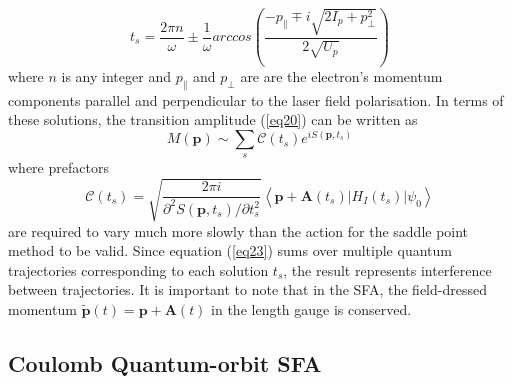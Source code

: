 \documentclass[11pt]{article}
\numberwithin{equation}{section}
\begin{document}
\begin{equation}
    t_s = \frac{2\pi n}{\omega} \pm \frac{1}{\omega} arccos \left (\frac{-p_{\parallel} \mp i \sqrt{2 I_p + p_\perp^2}}{2\sqrt{U_p}} \right )
\end{equation}
where $n$ is any integer and $p_\parallel$ and $p_\perp$ are are the electron's momentum components parallel and perpendicular to the laser field polarisation. In terms of these solutions, the transition amplitude (\ref{eq20}) can be written as 
\begin{equation} \label{eq23}
    M(\textbf{p}) \sim \sum_s \mathcal{C}(t_s) e^{iS(\textbf{p},t_s)}
\end{equation}
where prefactors 
\begin{equation} \label{eq:prefactor}
    \mathcal{C}(t_s) = \sqrt{\frac{2\pi i}{\partial^2S(\textbf{p},t_s)/\partial t_s^2}} \left\langle\textbf{p} + \textbf{A}(t_s)|H_I(t_s)|\psi_0\right\rangle
\end{equation}
are required to vary much more slowly than the action for the saddle point method to be valid\cite{wahl_1964_analytic}. Since equation (\ref{eq23}) sums over multiple quantum trajectories corresponding to each solution $t_s$, the result represents interference between trajectories. It is important to note that in the SFA, the field-dressed momentum $\tilde{\textbf{p}}(t) = \textbf{p} + \textbf{A}(t)$ in the length gauge is conserved.

\subsection{Coulomb Quantum-orbit SFA} \label{ch:CQSFA}
\end{document}
